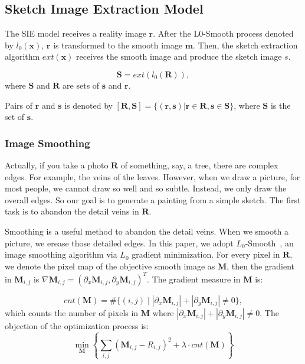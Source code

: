 \documentclass[10pt,twocolumn,letterpaper]{article}
\begin{document}
\subsection{Sketch Image Extraction Model}\label{subsec::SIE}
The SIE model receives a reality image $\bm{r}$. After the L0-Smooth process denoted by $l_0(\bm{x})$, $\bm{r}$ is transformed to the smooth image $\bm{m}$. Then, the sketch extraction algorithm $ext(\bm{x})$ receives the smooth image and produce the sketch image $s$.

\begin{equation*}
  \bm{S} = ext(l_0(\bm{R})),
  \label{equ::contributiveimg}
\end{equation*}
where $\bm{S}$ and $\bm{R}$ are sets of $\bm{s}$ and $\bm{r}$.

Pairs of $\bm{r}$ and $\bm{s}$ is denoted by $\bm{[R,S]}=\{(\bm{r},\bm{s})|\bm{r}\in \bm{R}, \bm{s}\in \bm{S}\}$, where $\bm{S}$ is the set of $\bm{s}$.

\subsubsection{Image Smoothing}\label{subsubsec::smoothing}
Actually, if you take a photo $\bm{R}$ of something, say, a tree, there are complex edges. For example, the veins of the leaves. However, when we draw a picture, for most people, we cannot draw so well and so subtle. Instead, we only draw the overall edges. So our goal is to generate a painting from a simple sketch. The first task is to abandon the detail veins in $\bm{R}$.

Smoothing is a useful method to abandon the detail veins. When we smooth a picture, we erease those detailed edges. In this paper, we adopt $L_0$-Smooth~\cite{xu2011image}, an image smoothing algorithm via $L_0$ gradient minimization. For every pixel in $\bm{R}$, we denote the pixel map of the objective smooth image as $\bm{M}$, then the gradient in $\bm{M}_{i, j}$ is $\nabla \bm{M}_{i, j}=(\partial_x \bm{M}_{i, j}, \partial_y \bm{M}_{i, j})^T$. The gradient measure in $\bm{M}$ is:

\begin{equation}
cnt(\bm{M}) = \#\{(i, j)\mid |\partial_x \bm{M}_{i, j}| + |\partial_y \bm{M}_{i, j}| \neq 0\},
\label{equ::cnt}
\end{equation}
which counts the number of pixels in $\bm{M}$ where $|\partial_x \bm{M}_{i, j}| + |\partial_y \bm{M}_{i, j}| \neq 0$. The objection of the optimization process is:
\begin{equation}
  \min_{\bm{M}}\left\{\sum_{i, j}(\bm{M}_{i, j} - R_{i, j})^2 + \lambda \cdot cnt(\bm{M}) \right\}
  \label{equ::minM}
\end{equation}
\end{document}
